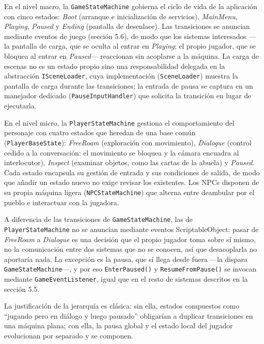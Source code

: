 \documentclass[12pt,twoside,titlepage]{report}
\begin{document}
En el nivel macro, la \texttt{GameStateMachine} gobierna el ciclo de vida de la aplicación con cinco estados: \textit{Boot} (arranque e inicialización de servicios), \textit{MainMenu}, \textit{Playing}, \textit{Paused} y \textit{Ending} (pantalla de desenlace). Las transiciones se anuncian mediante eventos de juego (sección 5.6), de modo que los sistemas interesados ---la pantalla de carga, que se oculta al entrar en \textit{Playing}; el propio jugador, que se bloquea al entrar en \textit{Paused}--- reaccionan sin acoplarse a la máquina. La carga de escenas no es un estado propio sino una responsabilidad delegada en la abstracción \texttt{ISceneLoader}, cuya implementación (\texttt{SceneLoader}) muestra la pantalla de carga durante las transiciones; la entrada de pausa se captura en un manejador dedicado (\texttt{PauseInputHandler}) que solicita la transición en lugar de ejecutarla.

En el nivel micro, la \texttt{PlayerStateMachine} gestiona el comportamiento del personaje con cuatro estados que heredan de una base común (\texttt{PlayerBaseState}): \textit{FreeRoam} (exploración con movimiento), \textit{Dialogue} (control cedido a la conversación: el movimiento se bloquea y la cámara encuadra al interlocutor), \textit{Inspect} (examinar objetos, como las cartas de la abuela) y \textit{Paused}. Cada estado encapsula su gestión de entrada y sus condiciones de salida, de modo que añadir un estado nuevo no exige revisar los existentes. Los NPCs disponen de su propia máquina ligera (\texttt{NPCStateMachine}) que alterna entre deambular por el pueblo e interactuar con la jugadora.

\begin{sloppypar}
A diferencia de las transiciones de \texttt{GameStateMachine}, las de \texttt{PlayerStateMachine} no se anuncian mediante eventos ScriptableObject: pasar de \textit{FreeRoam} a \textit{Dialogue} es una decisión que el propio jugador toma sobre sí mismo, no la comunicación entre dos sistemas que no se conocen, así que desacoplarla no aportaría nada. La excepción es la pausa, que sí llega desde fuera ---la dispara \texttt{GameStateMachine}---, y por eso \texttt{EnterPaused()} y \texttt{ResumeFromPause()} se invocan mediante \texttt{GameEventListener}, igual que en el resto de sistemas descritos en la sección 5.5.
\end{sloppypar}

La justificación de la jerarquía es clásica: sin ella, estados compuestos como ``jugando pero en diálogo y luego pausado'' obligarían a duplicar transiciones en una máquina plana; con ella, la pausa global y el estado local del jugador evolucionan por separado y se componen.
\end{document}
